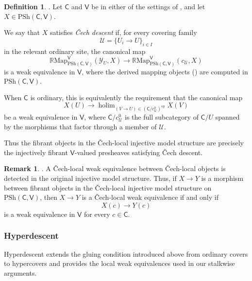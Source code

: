 \documentclass{amsart}
\newcommand{\cat}[1]{\mathsf{#1}}
\DeclareMathOperator*{\holim}{holim}
\newcommand{\Map}{\mathrm{Map}}
\newcommand{\psh}{\mathrm{PSh}}
\renewcommand{\op}{\mathrm{op}}
\newcommand{\Yo}{\mathscr{Y}}
\theoremstyle{definition}
\newtheorem{definition}[equation]{Definition}
\newtheorem{remark}[equation]{Remark}
\numberwithin{equation}{subsection}
\numberwithin{subsubsection}{subsection}
\begin{document}
\begin{definition}\label{def:cech.descent.condition}
  \textnormal{\cite[Definition~4.54]{Bar10}}.
  Let \(\cat{C}\) and \(\cat{V}\) be in either of the settings of
  , and let
  \(X\in\psh(\cat{C},\cat{V})\).

  We say that \(X\) satisfies \emph{\v{C}ech descent} if, for every covering
  family
  \[
    \mathcal{U}=\{U_i\to U\}_{i\in I}
  \]
  in the relevant ordinary site, the canonical map
  \[
    \mathbb{R}\Map_{\psh(\cat{C},\cat{V})}^{\cat{V}}(\Yo_{U},X)
    \longrightarrow
    \mathbb{R}\Map_{\psh(\cat{C},\cat{V})}^{\cat{V}}(c_{\mathcal{U}},X)
  \]
  is a weak equivalence in \(\cat{V}\), where the derived mapping objects
  () are
  computed in \(\psh(\cat{C},\cat{V})\).

  When \(\cat{C}\) is ordinary, this is equivalently the requirement
  that the canonical map
  \[
    X(U)
    \longrightarrow
    \holim_{(V\to U)\in(\cat{C}/c_{\mathcal{U}}^{0})^{\op}} X(V)
  \]
  be a weak equivalence in \(\cat{V}\), where
  \(\cat{C}/c_{\mathcal{U}}^{0}\) is the full subcategory of
  \(\cat{C}/U\) spanned by the morphisms that factor through a member of
  \(\mathcal{U}\).

  Thus the fibrant objects in the \v{C}ech-local injective model structure
  are precisely the injectively fibrant \(\cat{V}\)-valued presheaves
  satisfying \v{C}ech descent.
\end{definition}

\begin{remark}\label{rem:local.equivalences.between.local.objects}
  \textnormal{\cite[Proposition~3.2.13]{Hir03}}.
  A \v{C}ech-local weak equivalence between \v{C}ech-local objects is
  detected in the original injective model structure. Thus, if \(X\to Y\)
  is a morphism between fibrant objects in the \v{C}ech-local injective
  model structure on \(\psh(\cat{C},\cat{V})\), then \(X\to Y\) is a
  \v{C}ech-local weak equivalence if and only if
  \[
    X(c)\to Y(c)
  \]
  is a weak equivalence in \(\cat{V}\) for every \(c\in\cat{C}\).
\end{remark}

\subsubsection{Hyperdescent}
Hyperdescent extends the gluing condition introduced above from ordinary covers
to
hypercovers and provides the local weak equivalences used in our stalkwise
arguments.
\end{document}
